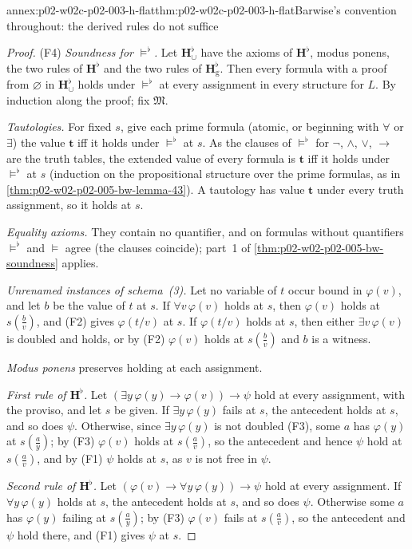 \begin{annexitem}{annex:p02-w02c-p02-003-h-flat}{thm:p02-w02c-p02-003-h-flat}{Barwise's convention throughout: the derived rules do not suffice}
\begin{proof}
(F4) \emph{Soundness for \(\models^{\flat}\).}  Let \(\mathbf H^{\flat}_{\cup}\)
have the axioms of \(\mathbf H^{\flat}\), modus ponens, the two rules of
\(\mathbf H^{\flat}\) and the two rules of \(\mathbf H^{\flat}_{\mathrm g}\).
Then every formula with a proof from \(\varnothing\) in
\(\mathbf H^{\flat}_{\cup}\) holds under \(\models^{\flat}\) at every
assignment in every structure for \(L\).  By induction along the proof; fix
\(\mathfrak M\).

\emph{Tautologies.}  For fixed \(s\), give each prime formula (atomic, or
beginning with \(\forall\) or \(\exists\)) the value \(\mathbf t\) iff it
holds under \(\models^{\flat}\) at \(s\).  As the clauses of
\(\models^{\flat}\) for \(\neg\), \(\land\), \(\lor\), \(\to\) are the truth
tables, the extended value of every formula is \(\mathbf t\) iff it holds
under \(\models^{\flat}\) at \(s\) (induction on the propositional
structure over the prime formulas, as in
\cref{thm:p02-w02-p02-005-bw-lemma-43}).  A tautology has value
\(\mathbf t\) under every truth assignment, so it holds at \(s\).

\emph{Equality axioms.}  They contain no quantifier, and on formulas
without quantifiers \(\models^{\flat}\) and \(\models\) agree (the clauses
coincide); part~1 of \cref{thm:p02-w02-p02-005-bw-soundness} applies.

\emph{Unrenamed instances of schema~(3).}  Let no variable of \(t\) occur
bound in \(\varphi(v)\), and let \(b\) be the value of \(t\) at \(s\).  If
\(\forall v\,\varphi(v)\) holds at \(s\), then \(\varphi(v)\) holds at
\(s(\tfrac bv)\), and (F2) gives \(\varphi(t/v)\) at \(s\).  If
\(\varphi(t/v)\) holds at \(s\), then either \(\exists v\,\varphi(v)\) is
doubled and holds, or by (F2) \(\varphi(v)\) holds at \(s(\tfrac bv)\) and
\(b\) is a witness.

\emph{Modus ponens} preserves holding at each assignment.

\emph{First rule of \(\mathbf H^{\flat}\).}  Let
\((\exists y\,\varphi(y)\to\varphi(v))\to\psi\) hold at every assignment,
with the proviso, and let \(s\) be given.  If \(\exists y\,\varphi(y)\) fails
at \(s\), the antecedent holds at \(s\), and so does \(\psi\).  Otherwise,
since \(\exists y\,\varphi(y)\) is not doubled (F3), some \(a\) has
\(\varphi(y)\) at \(s(\tfrac ay)\); by (F3) \(\varphi(v)\) holds at
\(s(\tfrac av)\), so the antecedent and hence \(\psi\) hold at
\(s(\tfrac av)\), and by (F1) \(\psi\) holds at \(s\), as \(v\) is not free
in \(\psi\).

\emph{Second rule of \(\mathbf H^{\flat}\).}  Let
\((\varphi(v)\to\forall y\,\varphi(y))\to\psi\) hold at every assignment.
If \(\forall y\,\varphi(y)\) holds at \(s\), the antecedent holds at \(s\),
and so does \(\psi\).  Otherwise some \(a\) has \(\varphi(y)\) failing at
\(s(\tfrac ay)\); by (F3) \(\varphi(v)\) fails at \(s(\tfrac av)\), so the
antecedent and \(\psi\) hold there, and (F1) gives \(\psi\) at \(s\).


\end{proof}
\end{annexitem}
